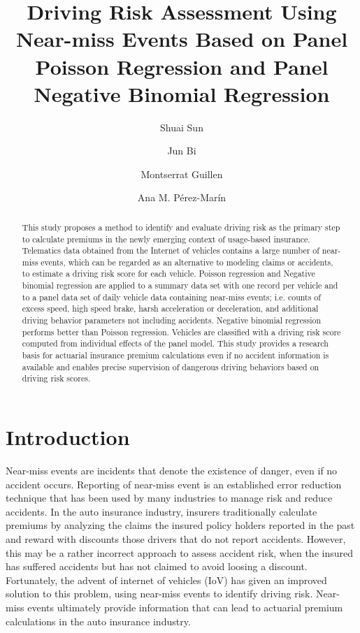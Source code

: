 \documentclass[num-refs]{wiley-article}
\title{Driving Risk Assessment Using Near-miss Events Based on Panel Poisson Regression and Panel Negative Binomial Regression}
\author[1\authfn{2}]{Shuai Sun}
\author[1]{Jun Bi}
\author[2]{Montserrat Guillen}
\author[2]{Ana M. Pérez-Marín}
\affil[1]{School of Traffic and Transportation, Key Laboratory of Transport Industry of Big Data Application Technologies for Comprehensive Transport, Beijing Jiaotong University, Beijing, 100044, China}
\affil[2]{Deptartment of Econometrics, Riskcenter-IREA, Universitat de Barcelona, Barcelona, 08034, Spain}
\begin{document}
\maketitle

\begin{abstract}
This study proposes a method to identify and evaluate driving risk as the primary step to calculate premiums in the newly emerging context of usage-based insurance. Telematics data obtained from the Internet of vehicles contains a large number of near-miss events, which can be regarded as an alternative to modeling claims or accidents, to estimate a driving risk score for each vehicle.  Poisson regression and Negative binomial regression are applied to a summary data set with one record per vehicle and to a panel data set of daily vehicle data containing near-miss events; i.e. counts of excess speed, high speed brake, harsh acceleration or deceleration, and additional driving behavior parameters not including accidents. Negative binomial regression performs better than Poisson regression. Vehicles are classified with a driving risk score computed from individual effects of the panel model. This study provides a research basis for actuarial insurance premium calculations even if no accident information is available and enables precise supervision of dangerous driving behaviors based on driving risk scores.

\end{abstract}

\section{Introduction}

Near-miss events are incidents that denote the existence of danger, even if no accident occurs. Reporting of near-miss event is an established error reduction technique that has been used by many industries to manage risk and reduce accidents. In the auto insurance industry, insurers traditionally calculate premiums by analyzing the claims the insured policy holders reported in the past and reward with discounts those drivers that do not report accidents. However, this may be a rather incorrect approach to assess accident risk, when the insured has suffered accidents but has not claimed to avoid loosing a discount. Fortunately, the advent of internet of vehicles (IoV) has given an improved solution to this problem, using near-miss events to identify driving risk. Near-miss events ultimately provide information that can lead to actuarial premium calculations in the auto insurance industry\cite{guillen2020can}.
\end{document}

